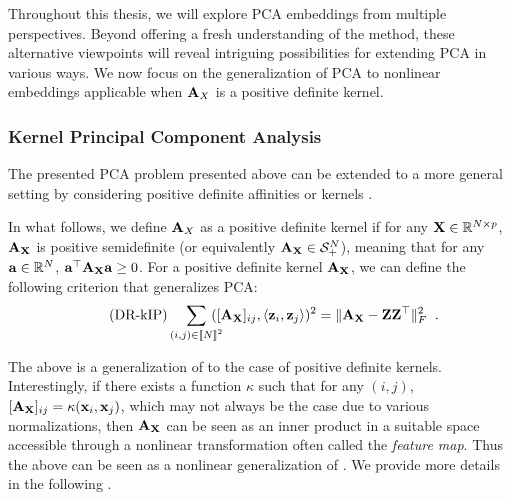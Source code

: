 Throughout this thesis, we will explore PCA embeddings from multiple perspectives. Beyond offering a fresh understanding of the method, these alternative viewpoints will reveal intriguing possibilities for extending PCA in various ways. We now focus on the generalization of PCA to nonlinear embeddings applicable when ${\mathbf{A}}_{X}$ is a positive definite kernel.

\subsubsection{Kernel Principal Component Analysis}

The presented PCA problem presented above can be extended to a more general setting by considering positive definite affinities or kernels \citep{scholkopf1998nonlinear}. 

In what follows, we define ${\mathbf{A}}_{X}$ as a positive definite kernel if for any ${\mathbf{X}} \in \mathbb{R}^{N \times p}$, ${\mathbf{A}}_{{\mathbf{X}}}$ is positive semidefinite (or equivalently ${\mathbf{A}}_{{\mathbf{X}}} \in \mathcal{S}^N_{+}$), meaning that for any ${\mathbf{a}} \in \mathbb{R}^N$, ${\mathbf{a}}^\top {\mathbf{A}}_{{\mathbf{X}}} {\mathbf{a}} \geq 0$. For a positive definite kernel ${\mathbf{A}}_{{\mathbf{X}}}$, we can define the following criterion that generalizes PCA:
\begin{align}\label{eq:DR_kIP}\tag{DR-kIP}
	\sum_{(i,j) \in {[\![N]\!]}^2} \!\!\!\!\! ([{\mathbf{A}}_{{\mathbf{X}}}]_{ij}, \langle {\mathbf{z}}_i, {\mathbf{z}}_j \rangle)^2 = \| {\mathbf{A}}_{{\mathbf{X}}} - {\mathbf{Z}}{\mathbf{Z}}^\top \|^2_F\ \:.
\end{align}

The above is a generalization of  to the case of positive definite kernels.
Interestingly, if there exists a function $\kappa$ such that for any $(i,j)$, $[{\mathbf{A}}_{{\mathbf{X}}}]_{ij} = \kappa({\mathbf{x}}_i, {\mathbf{x}}_j)$, which may not always be the case due to various normalizations, then ${\mathbf{A}}_{{\mathbf{X}}}$ can be seen as an inner product in a suitable space accessible through a nonlinear transformation often called the \emph{feature map}. Thus the above  can be seen as a nonlinear generalization of . We provide more details in the following .

